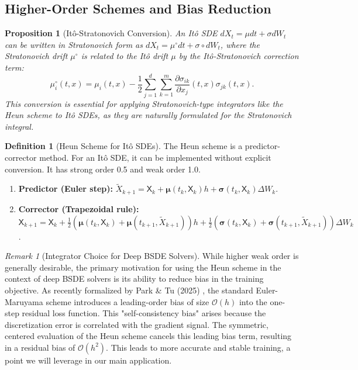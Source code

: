 \documentclass[11pt,letterpaper,oneside]{article}
\theoremstyle{plain}
\newtheorem{proposition}[theorem]{Proposition}
\theoremstyle{definition}
\newtheorem{definition}[theorem]{Definition}
\theoremstyle{remark}
\newtheorem{remark}{Remark}[section]
\begin{document}
\subsection{Higher-Order Schemes and Bias Reduction}
\label{sec:higher_order_mlmc}

\begin{proposition}[Itô-Stratonovich Conversion]
An Itô SDE $dX_t = \mu dt + \sigma dW_t$ can be written in Stratonovich form as $dX_t = \mu^\circ dt + \sigma \circ dW_t$, where the Stratonovich drift $\mu^\circ$ is related to the Itô drift $\mu$ by the Itô-Stratonovich correction term:
\[
\mu^\circ_i(t,x) = \mu_i(t,x) - \frac{1}{2} \sum_{j=1}^d \sum_{k=1}^m \frac{\partial \sigma_{ik}}{\partial x_j}(t,x) \sigma_{jk}(t,x).
\]
This conversion is essential for applying Stratonovich-type integrators like the Heun scheme to Itô SDEs, as they are naturally formulated for the Stratonovich integral.
\end{proposition}

\begin{definition}[Heun Scheme for Itô SDEs]
The Heun scheme is a predictor-corrector method. For an Itô SDE, it can be implemented without explicit conversion. It has strong order 0.5 and weak order 1.0.
\begin{enumerate}
    \item \textbf{Predictor (Euler step):} $\tilde{X}_{k+1} = \mathsf{X}_k + \bm{\mu}(t_k, \mathsf{X}_k)h + \bm{\sigma}(t_k, \mathsf{X}_k)\Delta W_k$.
    \item \textbf{Corrector (Trapezoidal rule):} $\mathsf{X}_{k+1} = \mathsf{X}_k + \frac{1}{2}(\bm{\mu}(t_k, \mathsf{X}_k) + \bm{\mu}(t_{k+1}, \tilde{X}_{k+1}))h + \frac{1}{2}(\bm{\sigma}(t_k, \mathsf{X}_k) + \bm{\sigma}(t_{k+1}, \tilde{X}_{k+1}))\Delta W_k$.
\end{enumerate}
\end{definition}

\begin{remark}[Integrator Choice for Deep BSDE Solvers]
While higher weak order is generally desirable, the primary motivation for using the Heun scheme in the context of deep BSDE solvers is its ability to reduce bias in the training objective. As recently formalized by Park \& Tu (2025) \cite{ParkTu2025}, the standard Euler-Maruyama scheme introduces a leading-order bias of size $\mathcal{O}(h)$ into the one-step residual loss function. This "self-consistency bias" arises because the discretization error is correlated with the gradient signal. The symmetric, centered evaluation of the Heun scheme cancels this leading bias term, resulting in a residual bias of $\mathcal{O}(h^2)$. This leads to more accurate and stable training, a point we will leverage in our main application.
\end{remark}
\end{document}
